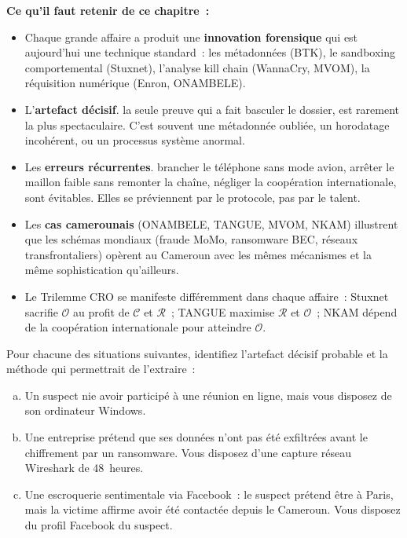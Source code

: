 \begin{boxresume}
\textbf{Ce qu'il faut retenir de ce chapitre~:}

\begin{itemize}
    \item Chaque grande affaire a produit une \textbf{innovation forensique}
          qui est aujourd'hui une technique standard~: les métadonnées (BTK),
          le sandboxing comportemental (Stuxnet), l'analyse kill chain
          (WannaCry, MVOM), la réquisition numérique (Enron, ONAMBELE).

    \item L'\textbf{artefact décisif}. la seule preuve qui a fait basculer
          le dossier, est rarement la plus spectaculaire. C'est souvent
          une métadonnée oubliée, un horodatage incohérent, ou un processus
          système anormal.

    \item Les \textbf{erreurs récurrentes}. brancher le téléphone sans
          mode avion, arrêter le maillon faible sans remonter la chaîne,
          négliger la coopération internationale, sont évitables. Elles
          se préviennent par le protocole, pas par le talent.

    \item Les \textbf{cas camerounais} (ONAMBELE, TANGUE, MVOM, NKAM)
          illustrent que les schémas mondiaux (fraude MoMo, ransomware BEC,
          réseaux transfrontaliers) opèrent au Cameroun avec les mêmes
          mécanismes et la même sophistication qu'ailleurs.

    \item Le Trilemme CRO se manifeste différemment dans chaque affaire~:
          Stuxnet sacrifie $\mathcal{O}$ au profit de $\mathcal{C}$ et
          $\mathcal{R}$~; TANGUE maximise $\mathcal{R}$ et $\mathcal{O}$~;
          NKAM dépend de la coopération internationale pour atteindre
          $\mathcal{O}$.
\end{itemize}
\end{boxresume}

\bigskip

\begin{boxexo}[title={\ding{45}\quad Exercice~3.1. Identification de l'artefact décisif \niveaubase}]
Pour chacune des situations suivantes, identifiez l'artefact décisif probable
et la méthode qui permettrait de l'extraire~:

\begin{enumerate}[(a)]
    \item Un suspect nie avoir participé à une réunion en ligne, mais vous
          disposez de son ordinateur Windows.
    \item Une entreprise prétend que ses données n'ont pas été exfiltrées
          avant le chiffrement par un ransomware. Vous disposez d'une
          capture réseau Wireshark de 48~heures.
    \item Une escroquerie sentimentale via Facebook~: le suspect prétend
          être à Paris, mais la victime affirme avoir été contactée depuis
          le Cameroun. Vous disposez du profil Facebook du suspect.
\end{enumerate}
\end{boxexo}

